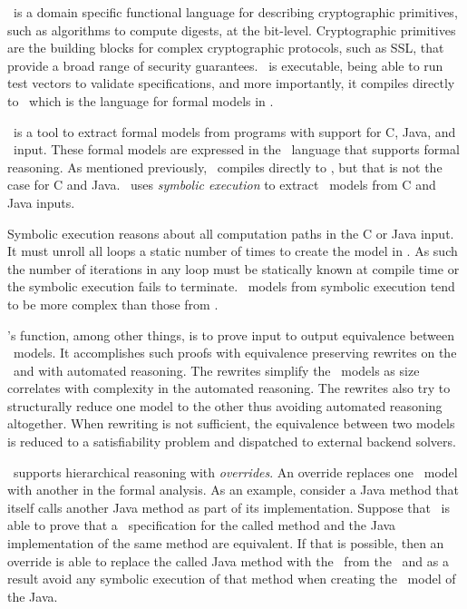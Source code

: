 \cryptol\ is a domain specific functional language for describing cryptographic primitives, such as algorithms to compute digests, at the bit-level.
Cryptographic primitives are the building blocks for complex cryptographic protocols, such as SSL, that provide a broad range of security guarantees.
\cryptol\ is executable, being able to run test vectors to validate specifications, and more importantly, it compiles directly to \sawcore\ which is the language for formal models in \saw.

\saw\ is a tool to extract formal models from programs with support for C, Java, and \cryptol\ input.
These formal models are expressed in the \sawcore\ language that supports formal reasoning.
As mentioned previously, \cryptol\ compiles directly to \sawcore, but that is not the case for C and Java.
\saw\ uses \emph{symbolic execution} to extract \sawcore\ models from C and Java inputs.

Symbolic execution reasons about all computation paths in the C or Java input.
It must unroll all loops a static number of times to create the model in \sawcore.
As such the number of iterations in any loop must be statically known at compile time or the symbolic execution fails to terminate.
\sawcore\ models from symbolic execution tend to be more complex than those from \cryptol.

\saw's function, among other things, is to prove input to output equivalence between \sawcore\ models.
It accomplishes such proofs with equivalence preserving rewrites on the \sawcore\ and with automated reasoning.
The rewrites simplify the \sawcore\ models as size correlates with complexity in the automated reasoning. 
The rewrites also try to structurally reduce one model to the other thus avoiding automated reasoning altogether.
When rewriting is not sufficient, the equivalence between two models is reduced to a satisfiability problem and dispatched to external backend solvers.

\saw\ supports hierarchical reasoning with \emph{overrides}.
An override replaces one \sawcore\ model with another in the formal analysis.
As an example, consider a Java method that itself calls another Java method as part of its implementation.
Suppose that \saw\ is able to prove that a \cryptol\ specification for the called method and the Java implementation of the same method are equivalent.
If that is possible, then an override is able to replace the called Java method with the \sawcore\ from the \cryptol\ and as a result avoid any symbolic execution of that method when creating the \sawcore\ model of the Java.


